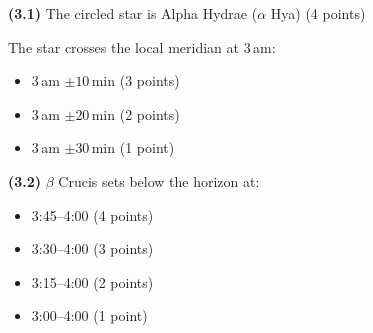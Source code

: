 \textbf{(3.1)} The circled star is Alpha Hydrae ($\alpha$ Hya)
\hfill(4 points)

The star crosses the local meridian at 3\,am:
\begin{itemize}
\item 3\,am $\pm 10$\,min \hfill(3 points)
\item 3\,am $\pm 20$\,min \hfill(2 points)
\item 3\,am $\pm 30$\,min \hfill(1 point)
\end{itemize}

\textbf{(3.2)} $\beta$ Crucis sets below the horizon at:
\begin{itemize}
\item 3:45--4:00 \hfill(4 points)
\item 3:30--4:00 \hfill(3 points)
\item 3:15--4:00 \hfill(2 points)
\item 3:00--4:00 \hfill(1 point)
\end{itemize}

